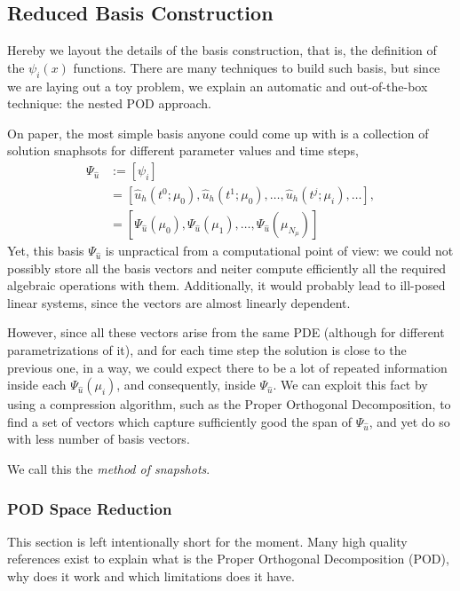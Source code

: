 \documentclass[../../1_heat_equation.tex]{subfiles}
\begin{document}
\subsection{Reduced Basis Construction}
\label{sec:1d_rom_heat_equation_basis_construction}
Hereby we layout the details of the basis construction, that is, the definition of the $\psi_i(x)$ functions.
There are many techniques to build such basis, but since we are laying out a toy problem, we explain an automatic and out-of-the-box technique: the nested POD approach. 

On paper, the most simple basis anyone could come up with is a collection of solution snaphsots for different parameter values and time steps, 
\begin{align}
    \Psi_{\hat{u}} &:= [\psi_i] \nonumber \\
    &= [\hat{u}_h(t^0; \mu_0), \hat{u}_h(t^1; \mu_0), 
    \ldots, \hat{u}_h(t^j; \mu_i), \ldots], \nonumber \\
    &= [\Psi_{\hat{u}}(\mu_0), \Psi_{\hat{u}}(\mu_1), \ldots, \Psi_{\hat{u}}(\mu_{N_{\mu}})]
\end{align}
Yet, this basis $\Psi_{\hat{u}}$ is unpractical from a computational point of view: we could not possibly store all the basis vectors and neiter compute efficiently all the required algebraic operations with them.
Additionally, it would probably lead to ill-posed linear systems, since the vectors are almost linearly dependent. 

However, since all these vectors arise from the same PDE (although for different parametrizations of it), and for each time step the solution is close to the previous one, in a way, we could expect there to be a lot of repeated information inside each $\Psi_{\hat{u}}(\mu_i)$, and consequently, inside $\Psi_{\hat{u}}$.
We can exploit this fact by using a compression algorithm, such as the Proper Orthogonal Decomposition, to find a set of vectors which capture sufficiently good the span of $\Psi_{\hat{u}}$, and yet do so with less number of basis vectors. 

We call this the \emph{method of snapshots}. 

\subsubsection{POD Space Reduction}
\label{sec:1d_rom_heat_equation_basis_construction_pod}
This section is left intentionally short for the moment.
Many high quality references exist to explain what is the Proper Orthogonal Decomposition (POD), why does it work and which limitations does it have.
\end{document}
